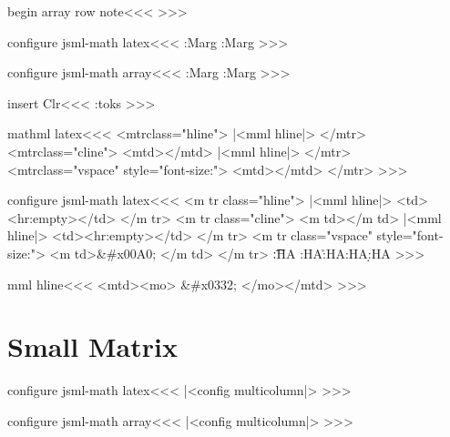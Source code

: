 {\<begin array row note\><<<
%
>>>




\<configure jsml-math latex\><<<
   {\PushStack\Col:Marg\AllColMargins
    \bgroup\Configure{$}{}{}{}} 
   {\egroup \PopStack\Col:Marg\AllColMargins}
   {}{}
>>>

\<configure jsml-math array\><<<
   {\PushStack\Col:Marg\AllColMargins
    \bgroup\Configure{$}{}{}{}} 
   {\egroup \PopStack\Col:Marg\AllColMargins}
   {}{}
>>>






\<insert Clr\><<<
\expandafter\tmp:toks\expandafter{\Clr}%
%
>>>





\<mathml latex\><<<
\def\:MM{m}
   {<mtr\Hnewline class="hline">} 
   {|<mml hline|>}
   {</mtr>}
   {<mtr\Hnewline class="cline">}
   {<mtd></mtd>}
   {|<mml hline|>}
   {</mtr>}
   {<mtr\Hnewline class="vspace" style="font-size:\HBorderspace">}
   {<mtd\Hnewline></mtd>}
   {</mtr>}
>>>

\<configure jsml-math latex\><<<
\def\:MM{\ifmathml m\fi}
   {<\:MM tr\Hnewline 
       \ifmathml \expandafterclass\else class\fi="hline">} 
   {\ifmathml|<mml hline|>\else
            <td><hr\xml:empty></td>\fi} 
   {</\:MM tr>}
   {<\:MM tr\Hnewline
       \ifmathml \expandafterclass\else class\fi ="cline">}
   {<\:MM td></\:MM td>}
   {\ifmathml|<mml hline|>\else
            <td><hr\xml:empty></td>\fi}
   {</\:MM tr>}
   {<\:MM tr\Hnewline
         \ifmathml \expandafterclass\else  class\fi="vspace"
         style="font-size:\HBorderspace">}
   {<\:MM td\Hnewline>\ifmathml\else\string&\#x00A0;\fi
      </\:MM td>}
   {</\:MM tr>}
   {\EndP{}}   \t:HA
   \R:HA\r:HA\D:HA\d:HA
>>>



\<mml hline\><<<
<mtd><mo> \string&\#x0332; </mo></mtd>
>>>

\section{Small Matrix}



\<configure jsml-math latex\><<<
|<config multicolumn|>
>>>


\<configure jsml-math array\><<<
|<config multicolumn|>
>>>


}
